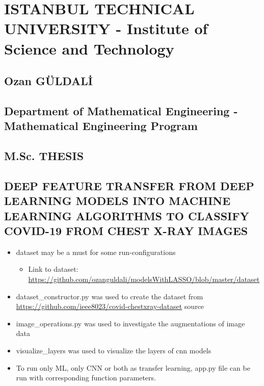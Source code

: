 \section*{ISTANBUL TECHNICAL UNIVERSITY - Institute of Science and
Technology}\label{istanbul-technical-university---institute-of-science-and-technology}

\subsection*{Ozan GÜLDALİ}\label{ozan-guldali}

\subsection*{Department of Mathematical Engineering - Mathematical
Engineering
Program}\label{department-of-mathematical-engineering---mathematical-engineering-program}

\subsection*{M.Sc. THESIS}\label{m.sc.-thesis}

\subsection*{DEEP FEATURE TRANSFER FROM DEEP LEARNING MODELS INTO MACHINE
LEARNING ALGORITHMS TO CLASSIFY COVID-19 FROM CHEST X-RAY IMAGES}\label{deep-feature-transfer-from-deep-learning-models-into-machine-learning-algorithms-to-classify-covid-19-from-chest-x-ray-and-demographic-information}


\begin{itemize}
\item
  dataset may be a must for some run-configurations

  \begin{itemize}
  \itemsep1pt\parskip0pt
  \item
    Link to dataset:
    \url{https://github.com/ozanguldali/modelsWithLASSO/blob/master/dataset}\\
  \end{itemize}
\item
  dataset\_constructor.py was used to create the dataset from
  \url{https://github.com/ieee8023/covid-chestxray-dataset} source
\item
  image\_operations.py was used to investigate the augmentations of
  image data
\item
  visualize\_layers was used to visualize the layers of cnn models
\item
  To run only ML, only CNN or both as transfer learning, app.py file can
  be run with corresponding function parameters.
\end{itemize}

